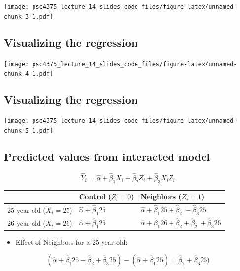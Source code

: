 \documentclass[
]{article}
\providecommand{\tightlist}{%
  \setlength{\itemsep}{0pt}\setlength{\parskip}{0pt}}
\begin{document}
\texttt{[image: psc4375\_lecture\_14\_slides\_code\_files/figure-latex/unnamed-chunk-3-1.pdf]}

\subsection{Visualizing the
regression}\label{visualizing-the-regression-1}

\texttt{[image: psc4375\_lecture\_14\_slides\_code\_files/figure-latex/unnamed-chunk-4-1.pdf]}

\subsection{Visualizing the
regression}\label{visualizing-the-regression-2}

\texttt{[image: psc4375\_lecture\_14\_slides\_code\_files/figure-latex/unnamed-chunk-5-1.pdf]}

\subsection{Predicted values from interacted
model}\label{predicted-values-from-interacted-model}

\[
\hat{Y}_i = \hat{\alpha} + \hat{\beta}_1 X_i + \hat{\beta}_2 Z_i + \hat{\beta}_3  X_i Z_i
\]

\begin{center}
\begin{tabular}{ r | l  l }
 & Control ($Z_i = 0$) & Neighbors ($Z_i = 1$) \\
\hline
25 year-old ($X_i = 25$)  & $\hat{\alpha} + \hat{\beta}_1 25$ &  $\hat{\alpha} + \hat{\beta}_1 25 + \hat{\beta}_2\ + \hat{\beta}_3 25$ \\
26 year-old ($X_i = 26$) & $\hat{\alpha} + \hat{\beta}_1 26$ &  $\hat{\alpha} + \hat{\beta}_1 26 + \hat{\beta}_2 + \hat{\beta}_2\ + \hat{\beta}_3 26$ \\
\end{tabular}
\end{center}

\begin{itemize}
\tightlist
\item
  Effect of Neighbors for a 25 year-old: \vspace{-10pt}
\end{itemize}

\[
(\hat{\alpha} + \hat{\beta}_1 25 + \hat{\beta}_2 + \hat{\beta}_3 25) - (\hat{\alpha} + \hat{\beta}_1 25) = \hat{\beta}_2 + \hat{\beta}_3 25)
\]
\end{document}
